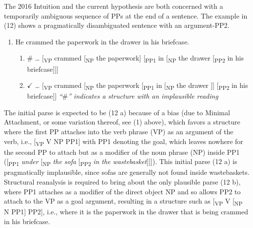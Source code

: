 \documentclass[11pt,oneside]{book}
\providecommand{\tightlist}{%
  \setlength{\itemsep}{0pt}\setlength{\parskip}{0pt}}
\begin{document}
The 2016 Intuition and the current hypothesis are both concerned with a temporarily ambiguous sequence of PPs at the end of a sentence. The example in (12) shows a pragmatically disambiguated sentence with an argument-PP2.

\begin{enumerate}
\def\labelenumi{(\arabic{enumi})}
\setcounter{enumi}{11}
\tightlist
\item
  He crammed the paperwork in the drawer in his briefcase.

  \begin{enumerate}
  \def\labelenumii{\alph{enumii}.}
  \tightlist
  \item
    \(\#\) \ldots{} {[}\textsubscript{VP} crammed {[}\textsubscript{NP} the paperwork{]} {[}\textsubscript{PP1} in {[}\textsubscript{NP} the drawer {[}\textsubscript{PP2} in his briefcase{]}{]}{]}
  \item
    \(\checkmark\) \ldots{} {[}\textsubscript{VP} crammed {[}\textsubscript{NP} the paperwork {[}\textsubscript{PP1} in {[}\textsubscript{NP} the drawer {]}{]} {[}\textsubscript{PP2} in his briefcase{]}{]} \linebreak\nopagebreak
    \emph{``\(\#\)'' indicates a structure with an implausible reading}
  \end{enumerate}
\end{enumerate}

The initial parse is expected to be (12 a) because of a bias (due to Minimal Attachment, or some variation thereof, see (1) above), which favors a structure where the first PP attaches into the verb phrase (VP) as an argument of the verb, i.e., {[}\textsubscript{VP} V NP PP1{]} with PP1 denoting the goal, which leaves nowhere for the second PP to attach but as a modifier of the noun phrase (NP) inside PP1 ({[}\textsubscript{PP1} \emph{under} {[}\textsubscript{NP} \emph{the sofa} {[}\textsubscript{PP2} \emph{in the wastebasket}{]}{]}{]}). This initial parse (12 a) is pragmatically implausible, since sofas are generally not found inside wastebaskets. Structural reanalysis is required to bring about the only plausible parse (12 b), where PP1 attaches as a modifier of the direct object NP and so allows PP2 to attach to the VP as a goal argument, resulting in a structure such as {[}\textsubscript{VP} V {[}\textsubscript{NP} N PP1{]} PP2{]}, i.e., where it is the paperwork in the drawer that is being crammed in his briefcase.
\end{document}
